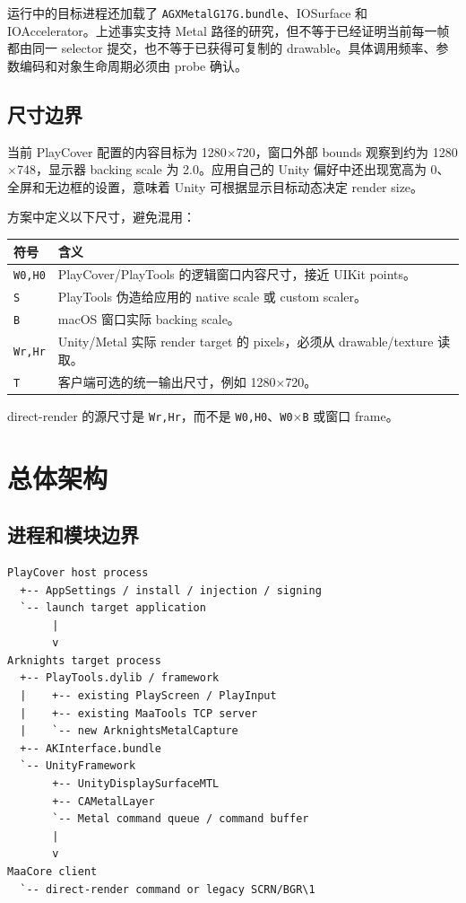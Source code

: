 \documentclass[UTF8,a4paper,11pt]{ctexart}
\begin{document}
运行中的目标进程还加载了 \texttt{AGXMetalG17G.bundle}、IOSurface 和 IOAccelerator。上述事实支持 Metal 路径的研究，但不等于已经证明当前每一帧都由同一 selector 提交，也不等于已获得可复制的 drawable。具体调用频率、参数编码和对象生命周期必须由 probe 确认。

\subsection{尺寸边界}

当前 PlayCover 配置的内容目标为 1280\(\times\)720，窗口外部 bounds 观察到约为 1280\(\times\)748，显示器 backing scale 为 2.0。应用自己的 Unity 偏好中还出现宽高为 0、全屏和无边框的设置，意味着 Unity 可根据显示目标动态决定 render size。

方案中定义以下尺寸，避免混用：

\begin{center}
\small
\begin{tabularx}{\textwidth}{>{\ttfamily}p{} X}
\toprule
符号 & 含义 \\
\midrule
\texttt{W0,H0} & PlayCover/PlayTools 的逻辑窗口内容尺寸，接近 UIKit points。\\
\texttt{S} & PlayTools 伪造给应用的 native scale 或 custom scaler。\\
\texttt{B} & macOS 窗口实际 backing scale。\\
\texttt{Wr,Hr} & Unity/Metal 实际 render target 的 pixels，必须从 drawable/texture 读取。\\
\texttt{T} & 客户端可选的统一输出尺寸，例如 1280\(\times\)720。\\
\bottomrule
\end{tabularx}
\end{center}

direct-render 的源尺寸是 \texttt{Wr,Hr}，而不是 \texttt{W0,H0}、\texttt{W0\(\times\)B} 或窗口 frame。

\section{总体架构}

\subsection{进程和模块边界}

\begin{lstlisting}
PlayCover host process
  +-- AppSettings / install / injection / signing
  `-- launch target application
       |
       v
Arknights target process
  +-- PlayTools.dylib / framework
  |    +-- existing PlayScreen / PlayInput
  |    +-- existing MaaTools TCP server
  |    `-- new ArknightsMetalCapture
  +-- AKInterface.bundle
  `-- UnityFramework
       +-- UnityDisplaySurfaceMTL
       +-- CAMetalLayer
       `-- Metal command queue / command buffer
       |
       v
MaaCore client
  `-- direct-render command or legacy SCRN/BGR\1
\end{lstlisting}
\end{document}
